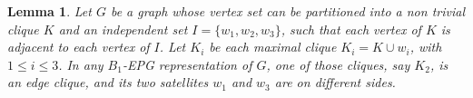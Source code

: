 \documentclass[9pt]{entcs}
\newtheorem{lema}[thm]{Lemma}%
\begin{document}



\begin{lema}\label{coro:3Cliques1EdgeClique}
Let $G$ be a graph whose vertex set  can be partitioned into a non trivial clique $K$ and an independent set $I=\{w_1,w_2,w_3\}$, such that each vertex of $K$ is adjacent to each vertex of $I$. Let $K_i$ be each maximal clique  $K_i = K \cup w_i$, with $1 \leq i \leq 3$.
In any $B_1$-EPG representation of $G$, one of those cliques, say $K_2$, is an edge clique, and its two  satellites $w_1$ and $w_3$ are
on different sides.
\end{lema}
\end{document}
